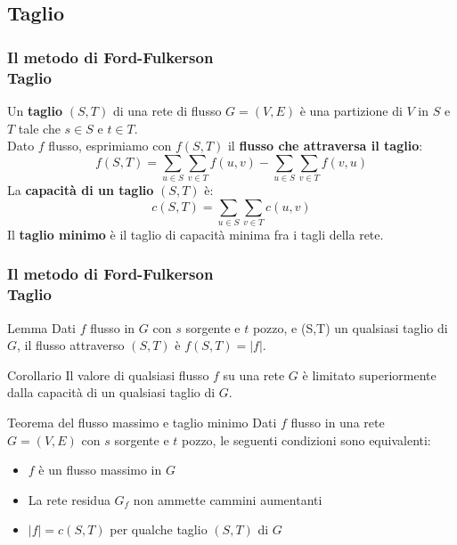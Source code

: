 \documentclass{beamer}
\begin{document}
\subsection{Taglio}

\begin{frame}
\frametitle{Il metodo di Ford-Fulkerson\\Taglio}
Un \textbf{taglio} $(S,T)$ di una rete di flusso $G=(V,E)$ è una partizione di $V$ in $S$ e $T$ tale che $s\in S$ e $t\in T$.\\
Dato $f$ flusso, esprimiamo con $f(S,T)$ il \textbf{flusso che attraversa il taglio}:
$$f(S,T)=\sum\limits_{u\in S}\sum\limits_{v\in T}f(u,v)-
         \sum\limits_{u\in S}\sum\limits_{v\in T}f(v,u)$$
La \textbf{capacità di un taglio} $(S,T)$ è:
$$c(S,T)=\sum\limits_{u\in S}\sum\limits_{v\in T}c(u,v)$$
Il \textbf{taglio minimo} è il taglio di capacità minima fra i tagli della rete.
\end{frame}

\begin{frame}
\frametitle{Il metodo di Ford-Fulkerson\\Taglio}
\begin{block}{Lemma}
Dati $f$ flusso in $G$ con $s$ sorgente e $t$ pozzo, e (S,T) un qualsiasi taglio di $G$, il flusso attraverso $(S,T)$ è $f(S,T)=|f|$.
\end{block}
\begin{block}{Corollario}
Il valore di qualsiasi flusso $f$ su una rete $G$ è limitato superiormente dalla capacità di un qualsiasi taglio di $G$.
\end{block}
\begin{block}{Teorema del flusso massimo e taglio minimo}
Dati $f$ flusso in una rete $G=(V,E)$ con $s$ sorgente e $t$ pozzo, le seguenti condizioni sono equivalenti:
\begin{itemize}
\item $f$ è un flusso massimo in $G$
\item La rete residua $G_f$ non ammette cammini aumentanti
\item $|f|=c(S,T)$ per qualche taglio $(S,T)$ di $G$
\end{itemize}
\end{block}
\end{frame}
\end{document}
